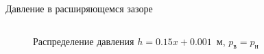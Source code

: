 \documentclass[ignoreonframetext,unicode]{beamer}
\begin{document}
\begin{frame}{Давление в расширяющемся зазоре}
\begin{columns}
		
		\begin{figure}[!htbp]
			\caption{Распределение давления $h = 0.15 x + 0.001$~м, $p_{\text{в}} = p_{\text{н}}$}
			\label{zero_pos}
		\end{figure}
	\end{columns}
\end{frame}
\end{document}
